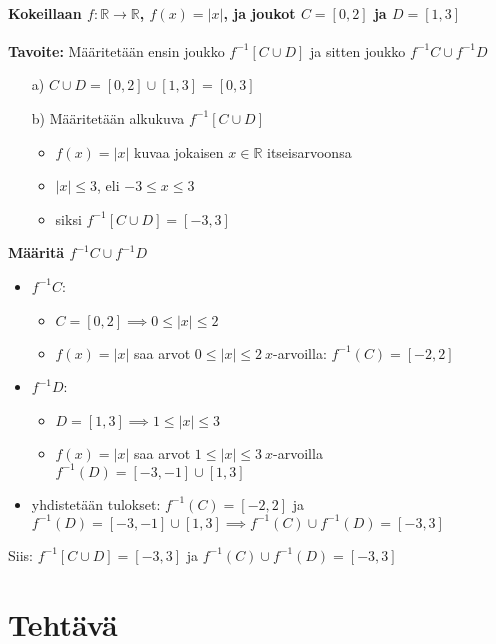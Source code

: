 \documentclass{article}
\newcounter{tehtava}
\begin{document}
    \paragraph*{Kokeillaan $f : \mathbb{R} \to \mathbb{R}$, $f(x) = |x|$, ja joukot $C = [0, 2]$ ja $D = [1, 3]$}\quad\newline
    \textbf{Tavoite:} Määritetään ensin joukko $f^{-1}[C \cup D]$ ja sitten joukko $f^{-1}C \cup f^{-1}D$
    \begin{itemize}
        \item[a)] $C \cup D = [0, 2] \cup [1, 3] = [0, 3]$
        \item[b)] Määritetään alkukuva $f^{-1}[C \cup D]$
        \begin{itemize}
            \item $f(x) = |x|$ kuvaa jokaisen $x \in \mathbb{R}$ itseisarvoonsa
            \item $|x| \leq 3$, eli $-3 \leq x \leq 3$
            \item siksi $f^{-1}[C \cup D] = [-3, 3]$
        \end{itemize}
    \end{itemize}
    \quad\newline
    \textbf{Määritä $f^{-1}C \cup f^{-1}D$}
    \begin{itemize}
        \item $f^{-1}C$:
        \begin{itemize}
            \item $C = [0, 2] \implies 0 \leq |x| \leq 2$
            \item $f(x) = |x|$ saa arvot $0 \leq |x| \leq 2 \ x$-arvoilla: $f^{-1}(C) = [-2, 2]$
        \end{itemize} 
        \item $f^{-1}D$:
        \begin{itemize}
            \item $D = [1, 3] \implies 1 \leq |x| \leq 3$
            \item $f(x) = |x|$ saa arvot $1 \leq |x| \leq 3 \ x$-arvoilla $f^{-1}(D) = [-3, -1] \cup [1, 3]$
        \end{itemize} 
        \item yhdistetään tulokset: $f^{-1}(C) = [-2, 2]$ ja $f^{-1}(D) = [-3, -1] \cup [1, 3] \implies 
        f^{-1}(C) \cup f^{-1}(D) = [-3, 3]$
    \end{itemize}
    \quad\newline
    Siis: $f^{-1}[C \cup D] = [-3, 3]$ ja $f^{-1}(C) \cup f^{-1}(D) = [-3, 3]$

    \newpage
	\section*{Tehtävä \thetehtava}

    
\end{document}
